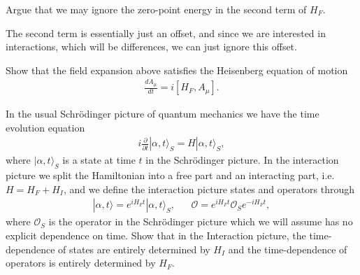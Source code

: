 \documentclass[working, oneside]{../../../Preambles/tuftebook}
\begin{document}
\begin{exercise}[2]
Argue that we may ignore the zero-point energy in the second term of $H_F$.
\end{exercise}
\begin{solution}
The second term is essentially just an offset, and since we are interested in interactions, which will be differences, we can just ignore this offset.
\end{solution}
\begin{exercise}[3]
Show that the field expansion above satisfies the Heisenberg 
equation of motion
\begin{align}
\frac{dA_\mu}{dt}=i\left[H_F,A_\mu\right].
\end{align}
\end{exercise}
\begin{solution}

\end{solution}
\begin{exercise}[4]
In the usual Schr{\"o}dinger picture of quantum mechanics we 
have the time evolution equation 
\begin{align}
i\frac{\partial}{\partial t}|\alpha,t\rangle_S=H|\alpha,t\rangle_S,
\end{align}
where $|\alpha,t\rangle_S$ is a state at time $t$ in the Schr{\"o}dinger
picture. In the interaction picture we split the Hamiltonian into a 
free part and an interacting part, i.e. $H=H_F+H_I$, and we define
the interaction picture states and operators through
\begin{align}
&|\alpha,t\rangle=e^{iH_F t}|\alpha,t\rangle_S,&
&\mathcal{O}=e^{iH_F t}\mathcal{O}_Se^{-iH_F t},&
\end{align}
where $\mathcal{O}_S$ is the operator in the Schr{\"o}dinger picture which 
we will assume has no explicit dependence on time. Show that in the Interaction
picture, the time-dependence of states are entirely determined by $H_I$ and 
the time-dependence of operators is entirely determined by $H_F$.
\end{exercise}
\end{document}
